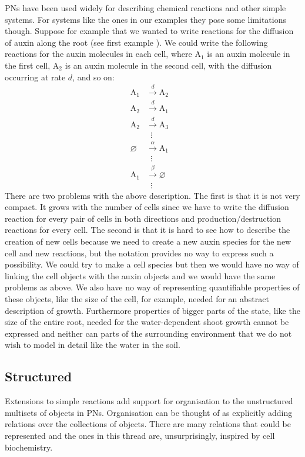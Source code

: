 PNs have been used widely for describing chemical reactions and other simple
systems. For systems like the ones in our examples they pose some limitations
though. Suppose for example that we wanted to write reactions for the diffusion
of auxin along the root (see first example  ). We could write
the following reactions for the auxin molecules in each cell, where
$\mathrm{A}_1$ is an auxin molecule in the first cell, $\mathrm{A}_2$ is an
auxin molecule in the second cell, with the diffusion occurring at rate
$d$, and so on:
\begin{align*}
\mathrm{A}_1 &\xrightarrow{d} \mathrm{A}_2 \\
\mathrm{A}_2 &\xrightarrow{d} \mathrm{A}_1 \\
\mathrm{A}_2 &\xrightarrow{d} \mathrm{A}_3\\
 &  \hspace{6pt}  \vdots& \\
\varnothing & \xrightarrow{\alpha} \mathrm{A}_1 \\
 & \hspace{6pt}  \vdots &\\
\mathrm{A}_1 &\xrightarrow{\beta} \varnothing \\
  & \hspace{6pt}  \vdots 
\end{align*}
There are two problems with the above description. The first is that it is not
very compact. It grows with the number of cells since we have to write the
diffusion reaction for every pair of cells in both directions and
production/destruction reactions for every cell. The second is that it is hard
to see how to describe the creation of new cells because we need to create a new
auxin species for the new cell and new reactions, but the notation provides no
way to express such a possibility. We could try to make a cell species but then
we would have no way of linking the cell objects with the auxin objects and we
would have the same problems as above. We also have no way of representing
quantifiable properties of these objects, like the size of the cell, for
example, needed for an abstract description of growth. Furthermore properties of
bigger parts of the state, like the size of the entire root, needed for the
water-dependent shoot growth cannot be expressed and neither can parts of the
surrounding environment that we do not wish to model in detail like the water in
the soil.

\subsection{Structured}
\label{subsec:structLangs}
Extensions to simple reactions add support for organisation to the
unstructured multisets of objects in PNs. Organisation can be thought of as
explicitly adding relations over the collections of objects. There are many
relations that could be represented and the ones in this thread are,
unsurprisingly, inspired by cell biochemistry.

